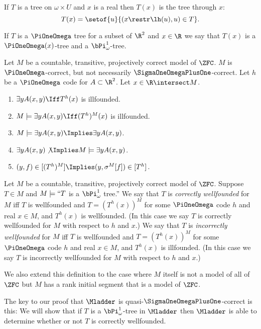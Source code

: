 \documentclass[oneside,12pt]{amsart}
\begin{document}
\begin{definition}
If $T$ is a tree on $\omega\times U$ and $x$ is a real then $T(x)$ is the tree through $x$:
$$T(x) = \setof{u}{(x\restr \lh(u), u) \in T}.$$

If $T$ is a $\PiOneOmega$ tree for a subset of $\R^2$ and $x\in\R$
we say that $T(x)$ is a $\PiOneOmega(x)$-tree
and a $\bPi^1_{\omega}$-tree.
\end{definition}

\begin{remarks}
Let $M$ be a countable, transitive, projectively correct model of $\ZFC$.
$M$ is $\PiOneOmega$-correct, but not necessarily $\SigmaOneOmegaPlusOne$-correct.
Let $h$ be a $\PiOneOmega$ code for $A\subset\R^2$.
Let $x\in\R\intersect M$.
\begin{enumerate}
\item $\exists y A(x,y) \Iff T^h(x)$ is illfounded.
\item $M\models \exists y A(x,y) \Iff (T^h)^M(x)$ is illfounded.
\item $M\models \exists y A(x,y) \Implies \exists y A(x,y)$.
\item $\exists y A(x,y) \not\Implies M\models \exists y A(x,y)$.
\item $(y,f)\in[(T^h)^M] \Implies (y, \sigma^M[f]) \in [T^h]$.
\end{enumerate}
\end{remarks}

\begin{definition}
Let $M$ be a countable, transitive, projectively correct model of $\ZFC$.
Suppose $T\in M$ and $M\models ``T$ is a $\bPi^1_{\omega}$ tree.''
We say that $T$ is \emph{correctly wellfounded} for $M$  iff $T$ is wellfounded and
$T=(T^h(x))^M$ for some
$\PiOneOmega$ code $h$ and real $x\in M$, and $T^h(x)$ is wellfounded. (In this
case we say $T$ is correctly wellfounded for $M$ with respect to $h$ and $x$.)
We say that $T$ is \emph{incorrectly wellfounded} for $M$ iff $T$ is wellfounded and $T=(T^h(x))^M$ for some
$\PiOneOmega$ code $h$ and real $x\in M$, and $T^h(x)$ is illfounded. (In this
case we say $T$ is incorrectly wellfounded for $M$ with respect to $h$ and $x$.)

We also extend this definition to the case where $M$ itself is not a model of all of $\ZFC$ but
$M$ has a rank initial segment that is a model of $\ZFC$.
\end{definition}

The key to our proof that $\Mladder$ is quasi-$\SigmaOneOmegaPlusOne$-correct is this:
We will show that if $T$ is a $\bPi^1_{\omega}$-tree in $\Mladder$ then
$\Mladder$ is able to determine whether or not $T$ is correctly wellfounded.
\end{document}
